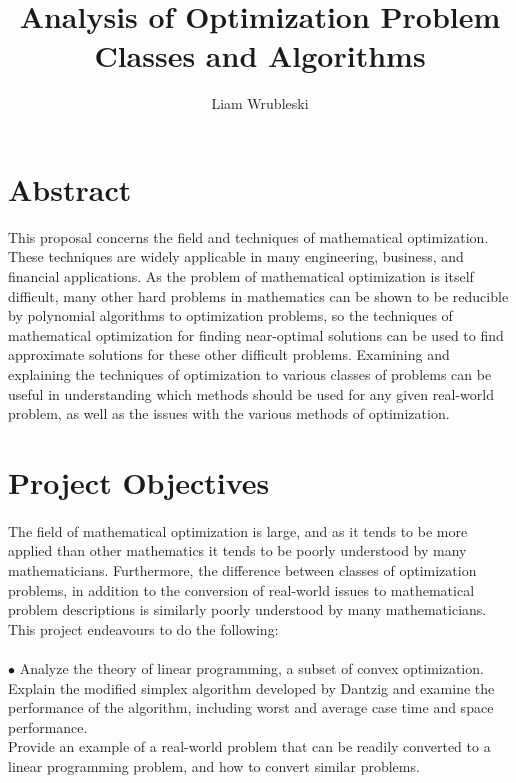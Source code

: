 \documentclass[11pt]{article}
\begin{document}
	\title{Analysis of Optimization Problem Classes and Algorithms}
	\author{Liam Wrubleski}
	
	\maketitle
	\section{Abstract}
	This proposal concerns the field and techniques of mathematical optimization. These techniques are widely applicable in many engineering, business, and financial applications. As the problem of mathematical optimization is itself difficult, many other hard problems in mathematics can be shown to be reducible by polynomial algorithms to optimization problems, so the techniques of mathematical optimization for finding near-optimal solutions can be used to find approximate solutions for these other difficult problems. Examining and explaining the techniques of optimization to various classes of problems can be useful in understanding which methods should be used for any given real-world problem, as well as the issues with the various methods of optimization.
	\section{Project Objectives}
	\paragraph*{}The field of mathematical optimization is large, and as it tends to be more applied than other mathematics it tends to be poorly understood by many mathematicians. Furthermore, the difference between classes of optimization problems, in addition to the conversion of real-world issues to mathematical problem descriptions is similarly poorly understood by many mathematicians. This project endeavours to do the following:
	\paragraph*{}$\bullet$ Analyze the theory of linear programming\cite{dantzig1963linear}, a subset of convex optimization. \\
	Explain the modified simplex algorithm developed by Dantzig\cite{10.1145/87252.88081} and examine the performance of the algorithm, including worst and average case time and space performance. \\
	Provide an example of a real-world problem that can be readily converted to a linear programming problem, and how to convert similar problems.
\end{document}
